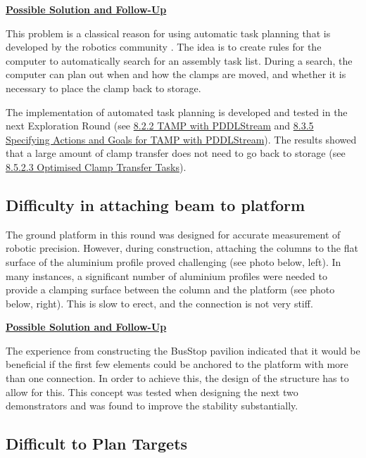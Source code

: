 {\textbf{\ul{Possible Solution and Follow-Up}}

This problem is a classical reason for using automatic task planning that is developed by the robotics community \parencite{ghallabAutomatedPlanningActing2016}. The idea is to create rules for the computer to automatically search for an assembly task list. During a search, the computer can plan out when and how the clamps are moved, and whether it is necessary to place the clamp back to storage. 

The implementation of automated task planning is developed and tested in the next Exploration Round (see \ul{8.2.2 TAMP with PDDLStream} and \ul{8.3.5 Specifying Actions and Goals for TAMP with PDDLStream}). The results showed that a large amount of clamp transfer does not need to go back to storage (see \ul{8.5.2.3 Optimised Clamp Transfer Tasks}).

\subsection{Difficulty in attaching beam to platform}
\label{subsection:exploration_3_difficulty_in_attaching_beam_to_platform}

The ground platform in this round was designed for accurate measurement of robotic precision. However, during construction, attaching the columns to the flat surface of the aluminium profile proved challenging (see photo below, left). In many instances, a significant number of aluminium profiles were needed to provide a clamping surface between the column and the platform (see photo below, right). This is slow to erect, and the connection is not very stiff.




\textbf{\ul{Possible Solution and Follow-Up}}

The experience from constructing the BusStop pavilion indicated that it would be beneficial if the first few elements could be anchored to the platform with more than one connection. In order to achieve this, the design of the structure has to allow for this. This concept was tested when designing the next two demonstrators and was found to improve the stability substantially.

\subsection{Difficult to Plan Targets}
\label{subsection:exploration_3_difficult_to_plan_targets}

}

